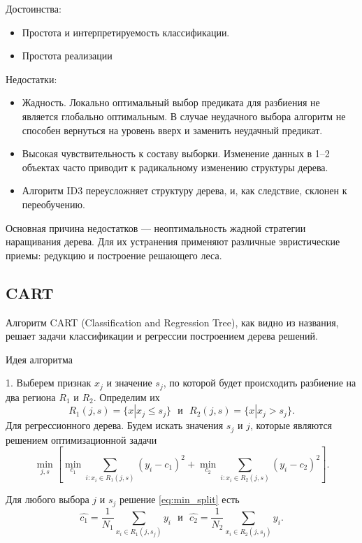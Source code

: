 \documentclass[14pt, a4paper]{article}
\begin{document}
Достоинства:
\begin{itemize}
\item Простота и интерпретируемость классификации.
\item Простота реализации
\end{itemize}

Недостатки:
\begin{itemize}
\item Жадность. Локально оптимальный выбор предиката для разбиения не является глобально оптимальным. В случае неудачного выбора алгоритм не способен вернуться на уровень вверх и заменить неудачный предикат.
\item Высокая чувствительность к составу выборки. Изменение данных в 1–2 объектах часто приводит к радикальному изменению структуры дерева.
\item Алгоритм ID3 переусложняет структуру дерева, и, как следствие, склонен к переобучению.
\end{itemize}

Основная причина недостатков --- неоптимальность жадной стратегии наращивания дерева. Для их устранения применяют различные эвристические приемы: редукцию и построение решающего леса.

\subsection{CART}
Алгоритм CART (Classification and Regression Tree), как видно из названия, решает задачи классификации и регрессии построением дерева решений.

Идея алгоритма 

1. Выберем признак $x_j$ и значение $s_j$, по которой будет происходить разбиение на два региона $R_1$ и $R_2$. Определим их \begin{equation}
\label{region}
 R_1(j,s) = \{x| x_j \leq s_j \} \ \ \ \text{и} \ \ \ R_2(j,s) = \{x| x_j > s_j \}.
 \end{equation}
 Для регрессионного дерева.
 Будем искать значения $s_j$ и $j$, которые являются решением оптимизационной задачи
\begin{equation}
\label{eq:min_split}
\min_{j,s}\left[ \min_{c_1} \sum_{i: x_i \in R_1(j,s)} (y_i - c_1)^2 + \min_{c_2} \sum_{i: x_i \in R_2(j,s)} (y_i - c_2)^2 \right].
\end{equation}

Для любого выбора $j$ и $s_j$ решение \eqref{eq:min_split} есть
\begin{equation}
\hat{c_1} = \frac{1}{N_1} \sum_{x_i \in R_1(j,s_j)} y_i \ \ \ \text{и} \ \ \ \hat{c_2} = \frac{1}{N_2} \sum_{x_i \in R_2(j,s_j)} y_i.
\end{equation}
\end{document}
